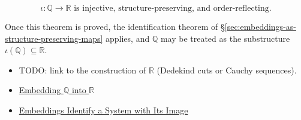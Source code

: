 \begin{remark*}
\[
\iota:\mathbb{Q}\to \mathbb{R} \text{ is injective, structure-preserving, and order-reflecting.}
\]
\end{remark*}
\begin{remark*}[Interpretation]
Once this theorem is proved, the identification theorem of \S\ref{sec:embeddings-as-structure-preserving-maps} applies, and $\mathbb{Q}$ may be treated as the substructure $\iota(\mathbb{Q})\subseteq \mathbb{R}$.
\end{remark*}
\begin{dependencies}
\begin{itemize}
  \item TODO: link to the construction of $\mathbb{R}$ (Dedekind cuts or Cauchy sequences).
  \item \hyperref[def:embedding-q-into-r]{Embedding $\mathbb{Q}$ into $\mathbb{R}$}
  \item \hyperref[thm:embedding-identifies-with-image]{Embeddings Identify a System with Its Image}
\end{itemize}
\end{dependencies}
